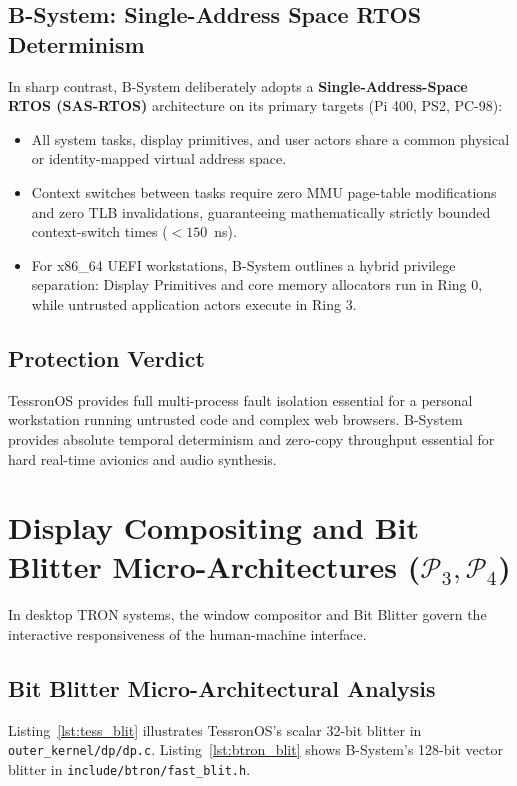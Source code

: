 \documentclass[10pt,journal,compsoc,twocolumn]{article}
\begin{document}
\subsection{B-System: Single-Address Space RTOS Determinism}
In sharp contrast, B-System deliberately adopts a \textbf{Single-Address-Space RTOS (SAS-RTOS)} architecture on its primary targets (Pi 400, PS2, PC-98):
\begin{itemize}[leftmargin=*]
    \item All system tasks, display primitives, and user actors share a common physical or identity-mapped virtual address space.
    \item Context switches between tasks require zero MMU page-table modifications and zero TLB invalidations, guaranteeing mathematically strictly bounded context-switch times ($< 150$~ns).
    \item For x86\_64 UEFI workstations, B-System outlines a hybrid privilege separation: Display Primitives and core memory allocators run in Ring 0, while untrusted application actors execute in Ring 3.
\end{itemize}

\subsection{Protection Verdict}
TessronOS provides full multi-process fault isolation essential for a personal workstation running untrusted code and complex web browsers. B-System provides absolute temporal determinism and zero-copy throughput essential for hard real-time avionics and audio synthesis.

\section{Display Compositing and Bit Blitter Micro-Architectures ($\mathcal{P}_3, \mathcal{P}_4$)}
\label{sec:display}

In desktop TRON systems, the window compositor and Bit Blitter govern the interactive responsiveness of the human-machine interface.

\subsection{Bit Blitter Micro-Architectural Analysis}
Listing~\ref{lst:tess_blit} illustrates TessronOS's scalar 32-bit blitter in \texttt{outer\_kernel/dp/dp.c}. Listing~\ref{lst:btron_blit} shows B-System's 128-bit vector blitter in \texttt{include/btron/fast\_blit.h}.
\end{document}
